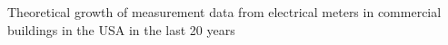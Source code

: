 Theoretical growth of measurement data from electrical meters in commercial buildings in the USA in the last 20 years
\label{fig:datagrowth}